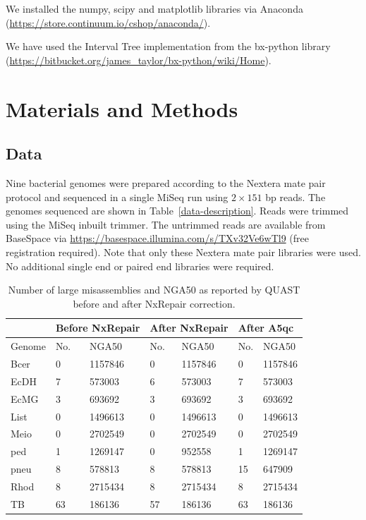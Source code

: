 \documentclass[fleqn,10pt]{wlpeerj}
\begin{document}
We installed the numpy, scipy and matplotlib libraries via Anaconda (\url{https://store.continuum.io/cshop/anaconda/}).

We have used the Interval Tree implementation from the bx-python library (\url{https://bitbucket.org/james_taylor/bx-python/wiki/Home}).   

\section*{Materials and Methods}
\subsection*{Data}
Nine bacterial genomes were prepared according to the Nextera mate pair protocol and sequenced in a single MiSeq run using $2 \times 151$ bp reads. The genomes sequenced are shown in Table~\ref{data-description}. Reads were trimmed using the MiSeq inbuilt trimmer. The untrimmed reads are available from BaseSpace via \url{https://basespace.illumina.com/s/TXv32Ve6wTl9} (free registration required). Note that only these Nextera mate pair libraries were used. No additional single end or paired end libraries were required. 

\begin{table}[]
\begin{center}
{\begin{tabular}{lllllll}\hline
 & \multicolumn{2}{l}{Before NxRepair} & \multicolumn{2}{l}{{\bf After NxRepair}} & \multicolumn{2}{l}{After A5qc} \\\hline
Genome & No. & NGA50 & No. & NGA50 & No. & NGA50 \\\midrule
Bcer & 0 & 1157846 & 0 & 1157846 & 0 & 1157846 \\
EcDH & 7 & 573003 & 6 & 573003 & 7 & 573003 \\
EcMG & 3 & 693692 & 3 & 693692 & 3 & 693692\\
List & 0 & 1496613 & 0 & 1496613 & 0 & 1496613 \\
Meio & 0 & 2702549 & 0 & 2702549 & 0 & 2702549 \\
ped & 1 & 1269147 & 0 & 952558 & 1 & 1269147 \\
pneu & 8 & 578813 & 8 & 578813 & 15 & 647909 \\
Rhod & 8 & 2715434 & 8 & 2715434 & 8 & 2715434 \\
TB & 63 & 186136 & 57 & 186136 & 63 & 186136 \\\hline
\end{tabular}}{}
\end{center}
\caption{Number of large misassemblies and NGA50 as reported by QUAST before and after NxRepair correction. \label{tab:improvement}}
\end{table}  
\end{document}
